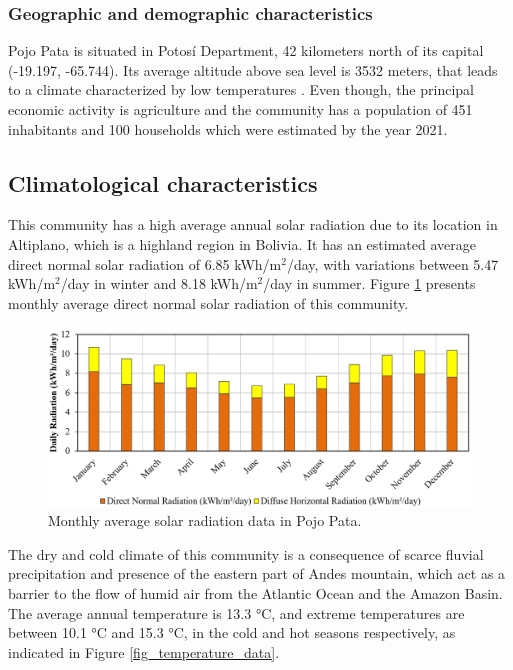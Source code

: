 \documentclass{ECOS_2019}
\begin{document}
\subsubsection{Geographic and demographic characteristics}
Pojo Pata is situated in Potosí Department, 42 kilometers north of its capital (-19.197, -65.744). Its average altitude above sea level is 3532 meters, that leads to a climate characterized by low temperatures \cite{VYMaps2021}. Even though, the principal economic activity is agriculture and the community has a population of 451 inhabitants and 100 households which were estimated by the year 2021\cite{InstitutoNacionaldeEstadistica2012}.
\subsection{Climatological characteristics}
This community has a high average annual solar radiation due to its location in Altiplano, which is a highland region in Bolivia. It has an estimated average direct normal solar radiation of 6.85 kWh/m$^2$/day, with variations between 5.47 kWh/m$^2$/day in winter and 8.18 kWh/m$^2$/day in summer\cite{Pfenninger2016,Gelaro2017}. Figure \ref{fig_solar_radiation_data} presents monthly average direct normal solar radiation of this community.
\begin{figure}[h!]
    \centering
    \includegraphics[scale=0.465]{Figures/Solar_radiation_data.png}
    \caption{Monthly average solar radiation data in Pojo Pata.}
    \label{fig_solar_radiation_data}
\end{figure}
The dry and cold climate of this community is a consequence of scarce fluvial precipitation and presence of the eastern part of Andes mountain, which act as a barrier to the flow of humid air from the Atlantic Ocean and the Amazon Basin\cite{Andressen2007}. The average annual temperature is 13.3 °C, and extreme temperatures are between 10.1 °C and 15.3 °C, in the cold and hot seasons respectively, as indicated in Figure \ref{fig_temperature_data}.
\end{document}
